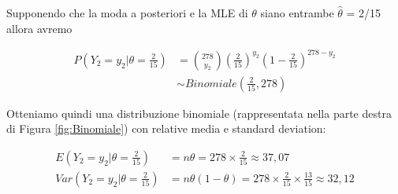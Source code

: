 Supponendo che la moda a posteriori e la MLE di $\theta$ siano entrambe $\hat{\theta}$ = 2/15 allora avremo 

\begin{align*}
    P\left(Y_2=y_2|\theta=\frac{2}{15}\right) &= \binom{278}{y_2}\left(\frac{2}{15}\right)^{y_2}\left(1-\frac{2}{15}\right)^{278-y_2} \\
    &\sim Binomiale\left(\frac{2}{15},278\right)
\end{align*}

Otteniamo quindi una distribuzione binomiale (rappresentata nella parte destra di Figura \ref{fig:Binomiale}) con relative media e standard deviation:

\begin{align*}
    E\left(Y_2=y_2|\theta=\frac{2}{15}\right) &= n\theta = 278\times\frac{2}{15} \approx 37,07\\
    Var\left(Y_2=y_2|\theta=\frac{2}{15}\right)  &= n\theta (1-\theta) = 278\times\frac{2}{15} \times \frac{13}{15} \approx 32,12
\end{align*}


